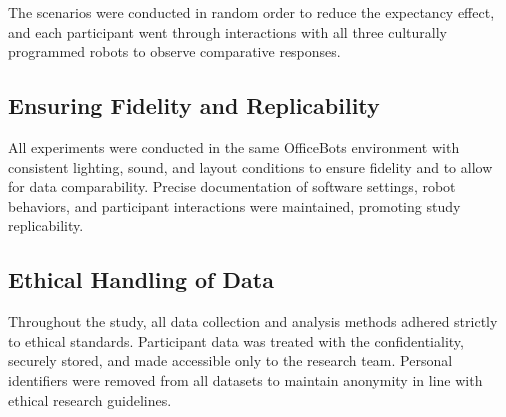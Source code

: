 The scenarios were conducted in random order to reduce the expectancy effect, and each participant went through interactions with all three culturally programmed robots to observe comparative responses.

\subsection{Ensuring Fidelity and Replicability}

All experiments were conducted in the same OfficeBots environment with consistent lighting, sound, and layout conditions to ensure fidelity and to allow for data comparability. Precise documentation of software settings, robot behaviors, and participant interactions were maintained, promoting study replicability.

\subsection{Ethical Handling of Data}

Throughout the study, all data collection and analysis methods adhered strictly to ethical standards. Participant data was treated with the confidentiality, securely stored, and made accessible only to the research team. Personal identifiers were removed from all datasets to maintain anonymity in line with ethical research guidelines.


